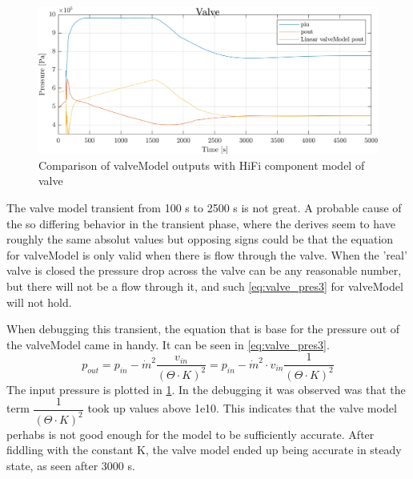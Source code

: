 \clearpage
\begin{figure}[h]
	\centering
	\includegraphics[width=1\textwidth]{Graphics/comp_test_val.png}
	\caption{Comparison of valveModel outputs with HiFi component model of valve}
	\label{fig:component_test_val}
\end{figure}
The valve model transient from 100 s to 2500 s is not great.
A probable cause of the so differing behavior in the transient phase, where the derives seem to have roughly the same absolut values but opposing signs could be that the equation for valveModel is only valid when there is flow through the valve. When the 'real' valve is closed the pressure drop across the valve can be any reasonable number, but there will not be a flow through it, and such \cref{eq:valve_pres3} for valveModel will not hold.

When debugging this transient, the equation that is base for the pressure out of the valveModel came in handy. It can be seen in \cref{eq:valve_pres3}.
\begin{equation}
	p_{out} = p_{in} - \dot{m}^2 \dfrac{v_{in}}{(\Theta \cdot K)^2} = p_{in} - \dot{m}^2 \cdot v_{in} \dfrac{1}{(\Theta \cdot K)^2} \label{eq:valve_pres3}
\end{equation}
The input pressure is plotted in \cref{fig:component_test_val}.
In the debugging it was observed was that the term $ \dfrac{1}{(\Theta \cdot K)^2} $ took up values above 1e10. This indicates that the valve model perhabs is not good enough for the model to be sufficiently accurate.
After fiddling with the constant K, the valve model ended up being accurate in steady state, as seen after 3000 s.

